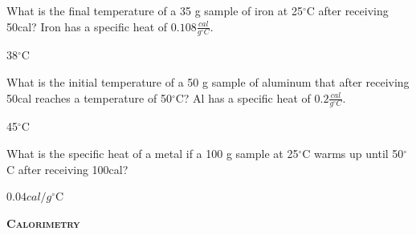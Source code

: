 \documentclass[main.tex]{subfiles}
\begin{document}
\begin{multicols*}{2}
\begin{question}[ID=\the\value{numA}]
What is the final temperature of a 35 g sample of iron at 25$^{\circ}$C after receiving 50cal?  Iron has a specific heat of $0.108\frac{cal}{g^{\circ}C}$.
\end{question}
\begin{solution}
38$^{\circ}$C
 \hspace{0.1cm}\end{solution}
\begin{question}[ID=\the\value{numA}]
What is the initial temperature of a 50 g sample of aluminum that after receiving 50cal reaches a temperature of 50$^{\circ}$C?  Al has a specific heat of $0.2\frac{cal}{g^{\circ}C}$.
\end{question}
\begin{solution}
45$^{\circ}$C
 \hspace{0.1cm}\end{solution}
\begin{question}[ID=\the\value{numA}]
What is the specific heat of a metal if a 100 g sample at 25$^{\circ}$C warms up until 50$^{\circ}$C after receiving 100cal? 
\end{question}
\begin{solution}
$0.04cal/g^{\circ}$C
 \hspace{0.1cm}\end{solution}

{\raggedright\textsc{\textbf{Calorimetry }}\par}


\end{multicols*}
\end{document}
